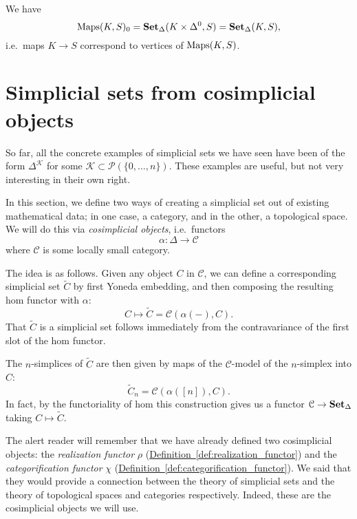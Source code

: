 \documentclass[main.tex]{subfiles}
\begin{document}
\begin{note}
  \label{note:morphisms_are_vertices_of_mapping_space}
  We have
  \begin{equation*}
    \operatorname{Maps}(K, S)_{0} = \operatorname{\mathbf{Set}_{\Delta}}(K \times \Delta^{0}, S) = \operatorname{\mathbf{Set}_{\Delta}}(K, S),
  \end{equation*}
  i.e.\ maps $K \to S$ correspond to vertices of $\operatorname{Maps}(K, S)$.
\end{note}

\section{Simplicial sets from cosimplicial objects}
\label{sec:simplicial_sets_from_cosimplicial_objects}

So far, all the concrete examples of simplicial sets we have seen have been of the form $\Delta^{\mathcal{K}}$ for some $\mathcal{K} \subset \mathcal{P}(\{0, \ldots, n\})$. These examples are useful, but not very interesting in their own right.

In this section, we define two ways of creating a simplicial set out of existing mathematical data; in one case, a category, and in the other, a topological space. We will do this via \emph{cosimplicial objects}, i.e.\ functors
\begin{equation*}
  \alpha\colon \Delta \to \mathcal{C}
\end{equation*}
where $\mathcal{C}$ is some locally small category. 

The idea is as follows. Given any object $C$ in $\mathcal{C}$, we can define a corresponding simplicial set $\tilde{C}$ by first Yoneda embedding, and then composing the resulting hom functor with $\alpha$:
\begin{equation*}
  C \mapsto \tilde{C} = \mathcal{C}(\alpha(-), C).
\end{equation*}
That $\tilde{C}$ is a simplicial set follows immediately from the contravariance of the first slot of the hom functor.

The $n$-simplices of $\tilde{C}$ are then given by maps of the $\mathcal{C}$-model of the $n$-simplex into $C$:
\begin{equation*}
  \tilde{C}_{n} = \mathcal{C}(\alpha([n]), C).
\end{equation*}
In fact, by the functoriality of hom this construction gives us a functor $\mathcal{C} \to \operatorname{\mathbf{Set}_{\Delta}}$ taking $C \mapsto \tilde{C}$.

The alert reader will remember that we have already defined two cosimplicial objects: the \emph{realization functor} $\rho$ (\hyperref[def:realization_functor]{Definition~\ref*{def:realization_functor}}) and the \emph{categorification functor} $\chi$ (\hyperref[def:categorification_functor]{Definition~\ref*{def:categorification_functor}}). We said that they would provide a connection between the theory of simplicial sets and the theory of topological spaces and categories respectively. Indeed, these are the cosimplicial objects we will use.
\end{document}

